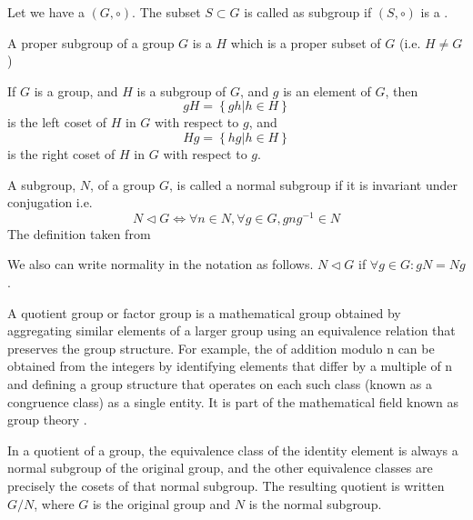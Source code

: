 \begin{appendices}
\begin{definition}[Subgroup]
  Let we have a  $\left(G, \circ\right)$. The
  subset $S \subset G$ is called as subgroup if $\left(S,
  \circ\right)$ is a .
  \label{def:subgroup}
\end{definition}

\begin{definition}
  A proper subgroup of a group $G$ is a  $H$
  which is a proper subset of $G$ (i.e. $H \ne G$) \cite{wiki:group}
  \label{def:propersubgroup}
\end{definition}

\begin{definition}[Coset]
  If $G$ is a group, and $H$ is a subgroup of $G$, and $g$ is an
  element of $G$, then
  \[
  gH = \left\{ gh \vert h \in H\right\}
  \]
  is the left coset of $H$ in $G$ with respect to $g$, and
  \[
  Hg = \left\{ hg \vert h \in H\right\}
  \]
  is the right coset of $H$ in $G$ with respect to $g$.
  \label{def:coset}
\end{definition}

\begin{definition}
  A subgroup, $N$, of a group $G$, is called a normal subgroup if it
  is invariant under conjugation i.e. 
  \[
  N \triangleleft G \Leftrightarrow
  \forall n \in N, \forall g \in G, g n g^{-1} \in N
  \]  
  The definition taken from \cite{wiki:normalsubgroup}

  We also can write normality in the  notation as
  follows.
  $N \triangleleft G$ if $\forall g \in G: gN = Ng$.
  \label{def:normalsubgroup}
\end{definition}

\begin{definition}
  A quotient group or factor group is a mathematical group obtained by
  aggregating similar elements of a larger group using an equivalence
  relation that preserves the group structure. For example, the
   of addition modulo n can be obtained from
  the integers by 
  identifying elements that differ by a multiple of n and defining a
  group structure that operates on each such class (known as a
  congruence class) as a single entity. It is part of the mathematical
  field known as group theory \cite{wiki:quotientgroup}. 

  In a quotient of a group, the equivalence class of the identity
  element is always a normal subgroup of the original group, and the
  other equivalence classes are precisely the cosets of that normal
  subgroup. The resulting quotient is written $G / N$, where $G$ is the
  original group and $N$ is the normal subgroup.


\end{definition}
\end{appendices}
